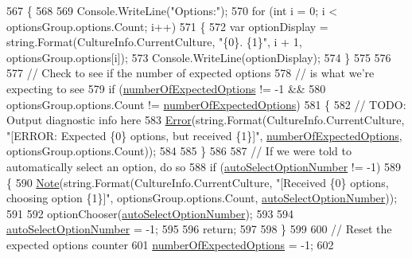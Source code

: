 \begin{DoxyCode}
567             \{
568 
569                 Console.WriteLine(\textcolor{stringliteral}{"Options:"});
570                 \textcolor{keywordflow}{for} (\textcolor{keywordtype}{int} i = 0; i < optionsGroup.options.Count; i++)
571                 \{
572                     var optionDisplay = string.Format(CultureInfo.CurrentCulture, \textcolor{stringliteral}{"\{0\}. \{1\}"}, i + 1, 
      optionsGroup.options[i]);
573                     Console.WriteLine(optionDisplay);
574                 \}
575 
576 
577                 \textcolor{comment}{// Check to see if the number of expected options}
578                 \textcolor{comment}{// is what we're expecting to see}
579                 \textcolor{keywordflow}{if} (\hyperlink{a00058_a2e17937195ecd64d5d867d958c45d2c3}{numberOfExpectedOptions} != -1 &&
580                     optionsGroup.options.Count != \hyperlink{a00058_a2e17937195ecd64d5d867d958c45d2c3}{numberOfExpectedOptions})
581                 \{
582                     \textcolor{comment}{// TODO: Output diagnostic info here}
583                     \hyperlink{a00197_a2f63f9f5b7634cb50ee75ff2eb18b137}{Error}(\textcolor{keywordtype}{string}.Format(CultureInfo.CurrentCulture, \textcolor{stringliteral}{"[ERROR: Expected \{0\} options, but
       received \{1\}]"}, \hyperlink{a00058_a2e17937195ecd64d5d867d958c45d2c3}{numberOfExpectedOptions}, optionsGroup.options.Count));
584 
585                 \}
586 
587                 \textcolor{comment}{// If we were told to automatically select an option, do so}
588                 \textcolor{keywordflow}{if} (\hyperlink{a00058_a34886671e91a1bf3fc225eeb67baced1}{autoSelectOptionNumber} != -1)
589                 \{
590                     \hyperlink{a00197_a939cc9e943c574b36c6af93e9c772702}{Note}(\textcolor{keywordtype}{string}.Format(CultureInfo.CurrentCulture, \textcolor{stringliteral}{"[Received \{0\} options, choosing
       option \{1\}]"}, optionsGroup.options.Count, \hyperlink{a00058_a34886671e91a1bf3fc225eeb67baced1}{autoSelectOptionNumber}));
591 
592                     optionChooser(\hyperlink{a00058_a34886671e91a1bf3fc225eeb67baced1}{autoSelectOptionNumber});
593 
594                     \hyperlink{a00058_a34886671e91a1bf3fc225eeb67baced1}{autoSelectOptionNumber} = -1;
595 
596                     \textcolor{keywordflow}{return};
597 
598                 \}
599 
600                 \textcolor{comment}{// Reset the expected options counter}
601                 \hyperlink{a00058_a2e17937195ecd64d5d867d958c45d2c3}{numberOfExpectedOptions} = -1;
602 

\end{DoxyCode}
